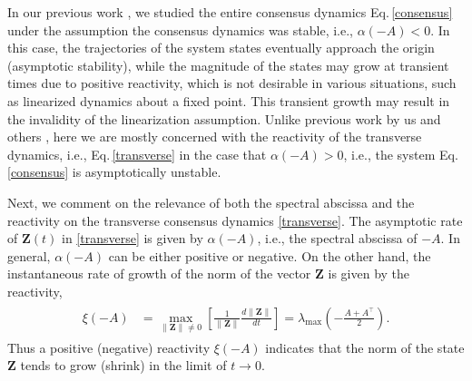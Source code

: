 \documentclass[%
 reprint,
 amsmath,amssymb,
 aip,
]{revtex4-2}
\def \bZ {\pmb{Z}}
\theoremstyle{italichead}
\theoremstyle{definition}
\begin{document}
{In our previous work \cite{nazerian2023single}, we studied the entire consensus dynamics Eq.\,\eqref{consensus} under the assumption the consensus dynamics was stable, i.e., $\alpha(-A) < 0$.
In this case, the trajectories of the system states eventually approach the origin (asymptotic stability), while the magnitude of the states may grow at transient times due to positive reactivity, which is not desirable in various situations, such as linearized dynamics about a fixed point. This transient growth may result in the invalidity of the linearization assumption.
Unlike previous work by us and others \cite{Farrell1996Generalized,Neubert1997ALTERNATIVES,Hennequin2012Nonnormal,Tang2014Reactivity,Biancalani2017Giant,Asllani2018Structure,MUOLO2019Patterns,Gudowska2020From,Lindmark2021Centrality,Duan2022Network,nazerian2023single,Nazerian2023Reactability},  here we are mostly concerned with the reactivity of the transverse dynamics, i.e., Eq.\,\eqref{transverse} in the case that $\alpha(-A) > 0$, i.e., the system Eq.\,\eqref{consensus} is asymptotically unstable.


Next, we comment on the relevance of both the spectral abscissa and the reactivity on the transverse consensus dynamics \eqref{transverse}. The asymptotic rate of $\bZ(t)$ in \eqref{transverse} is given by $\alpha(-A)$, i.e., the spectral abscissa of $-A$.
In general, $\alpha(-A)$ can be either positive or negative. 
On the other hand, the instantaneous rate of growth of the norm of the vector $\bZ$ is given by the reactivity,
\begin{align} \label{eq:reactivity0}
\begin{split}
    \xi\left( -A \right) & =  \max_{\|  \bZ\| \neq 0} \left[ \frac{1}{\|  \bZ \|} \frac{d \|  \bZ\|}{d t} \right] = \lambda_{\max} \left( -\frac{A+A^\top}{2} \right).
\end{split}
\end{align}
Thus a positive (negative) reactivity $\xi(-A)$ indicates that the norm of the state $\bZ$ tends to grow (shrink) in the limit of $t \rightarrow 0$. 

}
\end{document}
